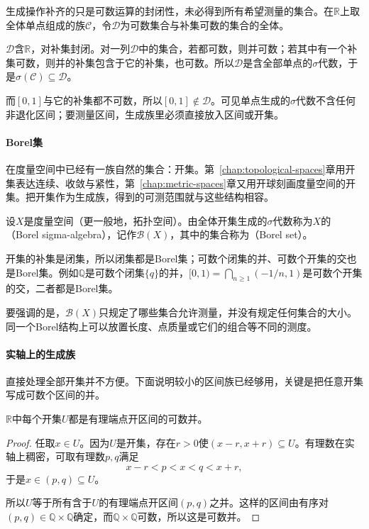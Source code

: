 生成操作补齐的只是可数运算的封闭性，未必得到所有希望测量的集合。在$\mathbb R$上取全体单点组成的族$\mathcal C$，令$\mathcal D$为可数集合与补集可数的集合的全体。

$\mathcal D$含$\mathbb R$，对补集封闭。对一列$\mathcal D$中的集合，若都可数，则并可数；若其中有一个补集可数，则并的补集包含于它的补集，也可数。所以$\mathcal D$是含全部单点的$\sigma$代数，于是$\sigma(\mathcal C)\subseteq\mathcal D$。

而$[0,1]$与它的补集都不可数，所以$[0,1]\notin\mathcal D$。可见单点生成的$\sigma$代数不含任何非退化区间；要测量区间，生成族里必须直接放入区间或开集。

\paragraph{Borel集}
在度量空间中已经有一族自然的集合：开集。第~\ref{chap:topological-spaces}章用开集表达连续、收敛与紧性，第~\ref{chap:metric-spaces}章又用开球刻画度量空间的开集。把开集作为生成族，得到的可测范围就与这些结构相容。

\begin{definition}
\label{def:meas-borel}
设$X$是度量空间（更一般地，拓扑空间）。由全体开集生成的$\sigma$代数称为$X$的（Borel sigma-algebra），记作$\mathcal B(X)$，其中的集合称为（Borel set）。
\end{definition}

开集的补集是闭集，所以闭集都是Borel集；可数个闭集的并、可数个开集的交也是Borel集。例如$\mathbb Q$是可数个闭集$\{q\}$的并，$[0,1)=\bigcap_{n\geq1}(-1/n,1)$是可数个开集的交，二者都是Borel集。

要强调的是，$\mathcal B(X)$只规定了哪些集合允许测量，并没有规定任何集合的大小。同一个Borel结构上可以放置长度、点质量或它们的组合等不同的测度。

\paragraph{实轴上的生成族}
直接处理全部开集并不方便。下面说明较小的区间族已经够用，关键是把任意开集写成可数个区间的并。

\begin{lemma}[开集的有理区间表示]
\label{lem:meas-open-rational-intervals}
$\mathbb R$中每个开集$U$都是有理端点开区间的可数并。
\end{lemma}

\begin{proof}
任取$x\in U$。因为$U$是开集，存在$r>0$使$(x-r,x+r)\subseteq U$。有理数在实轴上稠密，可取有理数$p,q$满足
\[
 x-r<p<x<q<x+r,
\]
于是$x\in(p,q)\subseteq U$。

所以$U$等于所有含于$U$的有理端点开区间$(p,q)$之并。这样的区间由有序对$(p,q)\in\mathbb Q\times\mathbb Q$确定，而$\mathbb Q\times\mathbb Q$可数，所以这是可数并。
\end{proof}

